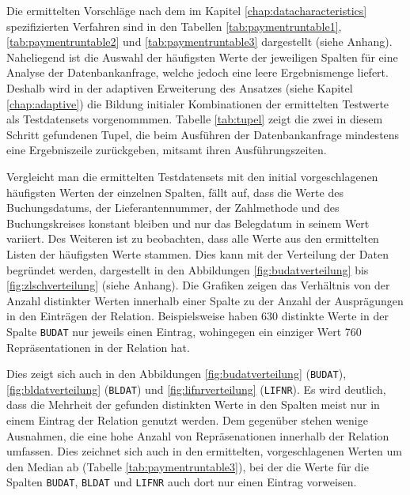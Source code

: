 Die ermittelten Vorschläge nach dem im Kapitel \ref{chap:datacharacteristics} spezifizierten Verfahren sind in den Tabellen \ref{tab:paymentruntable1}, \ref{tab:paymentruntable2} und \ref{tab:paymentruntable3} dargestellt (siehe Anhang).
Naheliegend ist die Auswahl der häufigsten Werte der jeweiligen Spalten für eine Analyse der Datenbankanfrage, welche jedoch eine leere Ergebnismenge liefert.
Deshalb wird in der adaptiven Erweiterung des Ansatzes (siehe Kapitel \ref{chap:adaptive}) die Bildung initialer Kombinationen der ermittelten Testwerte als Testdatensets vorgenommmen.
Tabelle \ref{tab:tupel} zeigt die zwei in diesem Schritt gefundenen Tupel, die beim Ausführen der Datenbankanfrage mindestens eine Ergebniszeile zurückgeben, mitsamt ihren Ausführungszeiten.
\begin{table}[h]
	\centering
	\caption{Gefundene Tupel für Testdatensets}
	\label{tab:tupel}
\end{table}

Vergleicht man die ermittelten Testdatensets mit den initial vorgeschlagenen häufigsten Werten der einzelnen Spalten, fällt auf, dass die Werte des Buchungsdatums, der Lieferantennummer, der Zahlmethode und des Buchungskreises konstant bleiben und nur das Belegdatum in seinem Wert variiert.
Des Weiteren ist zu beobachten, dass alle Werte aus den ermittelten Listen der häufigsten Werte stammen.
Dies kann mit der Verteilung der Daten begründet werden, dargestellt in den Abbildungen \ref{fig:budatverteilung} bis \ref{fig:zlschverteilung} (siehe Anhang).
Die Grafiken zeigen das Verhältnis von der Anzahl distinkter Werten innerhalb einer Spalte zu der Anzahl der Ausprägungen in den Einträgen der Relation.
Beispielsweise haben 630 distinkte Werte in der Spalte \texttt{BUDAT} nur jeweils einen Eintrag, wohingegen ein einziger Wert 760 Repräsentationen in der Relation hat.

Dies zeigt sich auch in den Abbildungen \ref{fig:budatverteilung} (\texttt{BUDAT}), \ref{fig:bldatverteilung} (\texttt{BLDAT}) und \ref{fig:lifnrverteilung} (\texttt{LIFNR}).
Es wird deutlich, dass die Mehrheit der gefunden distinkten Werte in den Spalten meist nur in einem Eintrag der Relation genutzt werden.
Dem gegenüber stehen wenige Ausnahmen, die eine hohe Anzahl von Repräsenationen innerhalb der Relation umfassen.
Dies zeichnet sich auch in den ermittelten, vorgeschlagenen Werten um den Median ab (Tabelle \ref{tab:paymentruntable3}), bei der die Werte für die Spalten \texttt{BUDAT}, \texttt{BLDAT} und \texttt{LIFNR} auch dort nur einen Eintrag vorweisen.

